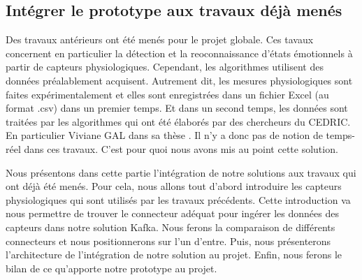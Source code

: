 \documentclass{article}
\begin{document}
	\subsection{Intégrer le prototype aux travaux déjà menés}\label{sec:travaux}
		Des travaux antérieurs ont été menés pour le projet globale.
		Ces tavaux concernent en particulier la détection et la reoconnaissance d'états émotionnels à partir de capteurs physiologiques.
		Cependant, les algorithmes utilisent des données préalablement acquisent.
		Autrement dit, les mesures physiologiques sont faites expérimentalement et elles sont enregistrées dans un fichier Excel (au format .csv) dans un premier temps.
		Et dans un second temps, les données sont traitées par les algorithmes qui ont été élaborés par des chercheurs du CEDRIC.
		En particulier Viviane GAL dans sa thèse \cite{gal_2019}.
		Il n'y a donc pas de notion de temps-réel dans ces travaux.
		C'est pour quoi nous avons mis au point cette solution.\par
		Nous présentons dans cette partie l'intégration de notre solutions aux travaux qui ont déjà été menés.
		Pour cela, nous allons tout d'abord introduire les capteurs physiologiques qui sont utilisés par les travaux précédents.
		Cette introduction va nous permettre de trouver le connecteur adéquat pour ingérer les données des capteurs dans notre solution Kafka.
		Nous ferons la comparaison de différents connecteurs et nous positionnerons sur l'un d'entre.
		Puis, nous présenterons l'architecture de l'intégration de notre solution au projet.
		Enfin, nous ferons le bilan de ce qu'apporte notre prototype au projet.
\end{document}
